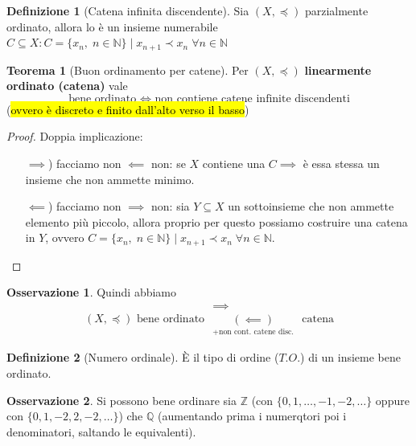 \documentclass[a4paper,10pt]{article}
\theoremstyle{definition}
\newcommand{\na}{\mathbb{N}} %
\newcommand{\za}{\mathbb{Z}} %
\newcommand{\qu}{\mathbb{Q}} %
\theoremstyle{indentdefinition}
\newtheorem{defn}{Definizione}[section]
\theoremstyle{indentpostulate}
\theoremstyle{indenttheorem}
\newtheorem{thm}{Teorema}[section]
\theoremstyle{myremark}
\newtheorem*{rem*}{Osservazione}
\theoremstyle{indentgeneral}
\newenvironment{myboxed} 
{\noindent\begin{lrbox}{\mybox}\begin{minipage}{\textwidth}}
{\end{minipage}\end{lrbox}\fbox{\usebox{\mybox}}}
\begin{document}
\begin{defn}[Catena infinita discendente]
    Sia $(X,\preceq)$ parzialmente ordinato, allora lo è un insieme numerabile $C\subseteq X: C=\{x_n,\;n\in\na\}\mid x_{n+1}\prec x_n\;\forall n\in\na$
\end{defn}

\begin{myboxed}
    \begin{thm}[Buon ordinamento per catene]
        Per $(X,\preceq)$ \textbf{linearmente ordinato (catena)} vale
        $$\text{bene ordinato }\iff\text{ non contiene catene infinite discendenti}$$
        (\hl{ovvero è discreto e finito dall'alto verso il basso})
    \end{thm}
\end{myboxed}

\begin{proof} Doppia implicazione:
\begin{itemize}
    \item[$\implies$)] facciamo non $\impliedby$ non: se $X$ contiene una $C\implies$ è essa stessa un insieme che non ammette minimo.
    \item[$\impliedby$)] facciamo non $\implies$ non: sia $Y\subseteq X$ un sottoinsieme che non ammette elemento più piccolo, allora proprio per questo possiamo costruire una catena in $Y$, ovvero $C=\{x_n,\;n\in\na\}\mid x_{n+1}\prec x_n\;\forall n\in\na$.
\end{itemize}
\end{proof}

\begin{rem*}
    Quindi abbiamo
    $$(X,\preceq) \text{ bene ordinato }\begin{array}{c}
         \implies  \\
         \underset{+\text{non cont. catene disc.}}{(\impliedby)}
    \end{array} \text{ catena}$$
\end{rem*}

\begin{defn}[Numero ordinale]
    È il tipo di ordine ($T.O.$) di un insieme bene ordinato.
\end{defn}

\begin{rem*}
    Si possono bene ordinare sia $\za$ (con $\{0,1,\dots,-1,-2,\dots\}$ oppure con $\{0,1,-2,2,-2,\dots\}$) che $\qu$ (aumentando prima i numerqtori poi i denominatori, saltando le equivalenti).
\end{rem*}
\end{document}
